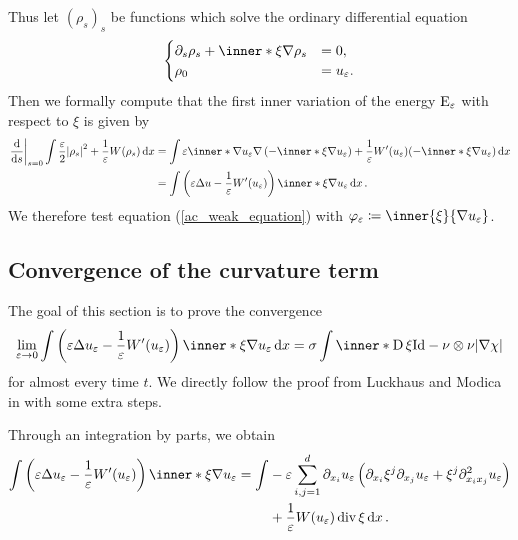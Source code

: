 Thus let $ ( \rho_{ s } )_{ s } $ be functions which solve the ordinary 
differential equation
\[
\begin{cases}
	\partial_{ s } \rho_{ s } 
	+
	\inner*{ \xi }{ \nabla \rho_{ s } }
	& = 0,
	\\
	\rho_{ 0 } & = u_{ \varepsilon }.
\end{cases}
\]
Then we formally compute that the first inner variation of the energy $ 
\operatorname{E}_{ \varepsilon } $ with respect to $ \xi $ is given by
\begin{align*}
	\left.\dv{ s }\right|_{ s = 0 }
	\int
	\frac{ \varepsilon }{ 2 }
	\abs{ \rho_{ s } }^{ 2 }
	+
	\frac{ 1 }{ \varepsilon }
	W ( \rho_{ s } )
	\dd{ x }
	& =
	\int
	\varepsilon 
	\inner*{ \nabla u_{ \varepsilon } }
	{ \nabla \left( - \inner*{ \xi }{ \nabla u_{ \varepsilon } } \right) }
	+
	\frac{ 1 }{ \varepsilon }
	W'( u_{ \varepsilon } ) ( -\inner*{ \xi }{ \nabla u_{ \varepsilon } } )
	\dd{ x }
	\\
	& =
	\int
	\left(
	\varepsilon \Delta u - \frac{ 1 }{ \varepsilon } W'( u_{ \varepsilon } )
	\right)
	\inner*{ \xi }{ \nabla u_{ \varepsilon } } 
	\dd{ x }.
\end{align*}
We therefore test equation (\ref{ac_weak_equation}) with $ \varphi_{ 
\varepsilon } \coloneqq \inner{ \xi }{ \nabla u_{ \varepsilon } } $.

\subsection{Convergence of the curvature term}

The goal of this section is to prove the convergence
\begin{equation*}
	\lim_{ \varepsilon \to 0 }
	\int
	\left(
	\varepsilon \Delta u_{ \varepsilon }
	- 
	\frac{ 1 }{ \varepsilon }
	W'( u_{ \varepsilon } )
	\right)
	\inner*{ \xi }{ \nabla u_{ \varepsilon } }
	\dd{ x }
	=
	\sigma
	\int
	\inner*{ \diff \xi }{ \mathrm{Id} - \nu \otimes \nu }
	\abs{ \nabla \chi }
\end{equation*} 
for almost every time $ t $. We directly follow the proof from Luckhaus and 
Modica in \cite{luckhaus_modica_gibbs_thompson_relation} with some extra steps.

Through an integration by parts, we obtain
\begin{align}
	\label{conv_of_curv_first_ibp_scalar}
	\int
	\left(
	\varepsilon \Delta u_{ \varepsilon }
	-
	\frac{ 1 }{ \varepsilon } W'(u_{ \varepsilon } ) 
	\right)
	\inner*{ \xi }{ \nabla u_{ \varepsilon } }
	= 
	\int
	& - \varepsilon 
	\sum_{ i, j = 1 }^{ d }
	\partial_{ x_{ i } } u_{ \varepsilon }
	\left(
	\partial_{ x_{ i } } \xi^{ j }
	\partial_{ x_{ j } } u_{ \varepsilon }
	+
	\xi^{ j }
	\partial_{ x_{ i } x_{ j } }^{ 2 } u_{ \varepsilon }
	\right)
	\notag
	\\
	& +
	\frac{ 1 }{ \varepsilon }
	W ( u_{ \varepsilon } )
	\divg \xi 
	\dd{ x }.
\end{align}

